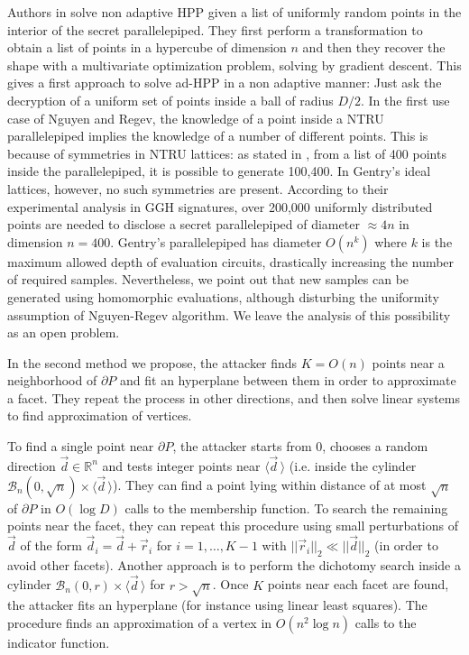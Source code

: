 \documentclass[11pt]{article}
\theoremstyle{plain}
\theoremstyle{definition}
\theoremstyle{remark}
\newcommand{\RR}{\mathbb{R}}      %
\newcommand{\ie}{i.e.$\!$ }
\newcommand{\bra}{\langle}
\newcommand{\ket}{\rangle}
\begin{document}
Authors in \cite{Nguyen2009} solve non adaptive HPP given a list of uniformly random points in the interior of the secret parallelepiped. They first perform a transformation to obtain a list of points in a hypercube of dimension $n$ and then they recover the shape with a multivariate optimization problem, solving by gradient descent. This gives a first approach to solve ad-HPP in a non adaptive manner: Just ask the decryption of a uniform set of points inside a ball of radius $D/2$. In the first use case of Nguyen and Regev, the knowledge of a point inside a NTRU parallelepiped implies the knowledge of a number of different points. This is because of symmetries in NTRU lattices: as stated in \cite{Nguyen2009}, from a list of 400 points inside the parallelepiped, it is possible to generate 100,400. In Gentry's ideal lattices, however, no such symmetries are present. According to their experimental analysis in GGH signatures, over 200,000 uniformly distributed points are needed to disclose a secret parallelepiped of diameter $\approx 4n$ in dimension $n=400$. Gentry's parallelepiped has diameter $O(n^k)$ where $k$ is the maximum allowed depth of evaluation circuits, drastically increasing the number of required samples. Nevertheless, we point out that new samples can be generated using homomorphic evaluations, although disturbing the uniformity assumption of Nguyen-Regev algorithm. We leave the analysis of this possibility as an open problem.

In the second method we propose, the attacker finds $K=O(n)$ points near a neighborhood of $\partial P$ and fit an hyperplane between them in order to approximate a facet. They repeat the process in other directions, and then solve linear systems to find approximation of vertices.

To find a single point near $\partial P$, the attacker starts from $0$, chooses a random direction $\vec d\in \RR^n$ and tests integer points near $\bra \vec{d}  \,\ket$ (\ie inside the cylinder $\mathcal{B}_{n}(0,\sqrt n)\times \bra \vec{d}  \,\ket$). They can find a point lying within distance of at most $\sqrt{n}$ of $\partial P$ in $O(\log D)$ calls to the membership function. To search the remaining points near the facet, they can repeat this procedure using small perturbations of $\vec d$ of the form $\vec d_i=\vec d+\vec r_i$ for $i=1,\dots,K-1$ with $||\vec r_i||_2\ll ||\vec d||_2$ (in order to avoid other facets). Another approach is to perform the dichotomy search inside a cylinder $\mathcal{B}_{n}(0,r)\times \bra \vec{d}  \,\ket$ for $r> \sqrt n$. Once $K$ points near each facet are found, the attacker fits an hyperplane (for instance using linear least squares). The procedure finds an approximation of a vertex in $O(n^2\log n)$ calls to the indicator function. 
\end{document}

